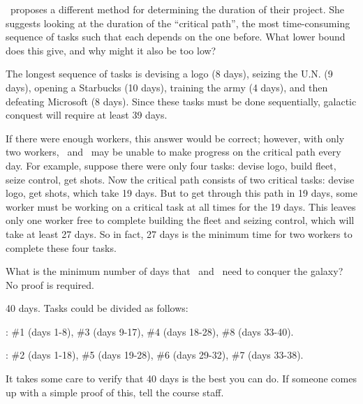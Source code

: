 \begin{problem}
\ppart \Jay\  proposes a different method for determining the
duration of their project.  She suggests looking at the duration of
the ``critical path'', the most time-consuming sequence of tasks
such that each depends on the one before.  What lower bound does this
give, and why might it also be too low?

\begin{solution}
The longest sequence of tasks is devising a logo (8 days),
seizing the U.N. (9 days), opening a Starbucks (10 days), training
the army (4 days), and then defeating Microsoft (8 days).  Since these
tasks must be done sequentially, galactic conquest will require at
least 39 days.

If there were enough workers, this answer would be correct; however, with
only two workers, \Jay\  and \Rongrong\  may be unable to make progress on the
critical path every day.  For example, suppose there were only four
tasks: devise logo, build fleet, seize control, get shots.  Now the
critical path consists of two critical tasks: devise logo, get shots,
which take 19 days.  But to get through this path in 19 days, some worker
must be working on a critical task at all times for the 19 days.  This
leaves only one worker free to complete building the fleet and seizing
control, which will take at least 27 days.  So in fact, 27 days is the
minimum time for two workers to complete these four tasks.
\end{solution}

\ppart What is the minimum number of days that \Jay\  and \Rongrong\ 
need to conquer the galaxy?  No proof is required.

\begin{solution}
40 days.  Tasks could be divided as follows:

\Rongrong: \#1 (days 1-8), \#3 (days 9-17), \#4 (days 18-28), \#8 (days
33-40).

\Jay: \#2 (days 1-18), \#5 (days 19-28), \#6 (days 29-32), \#7 (days
33-38).  

It takes some care to verify that 40 days is the best you can do.  If
someone comes up with a simple proof of this, tell the course staff.

\end{solution}
\eparts
\end{problem} 


\endinput
